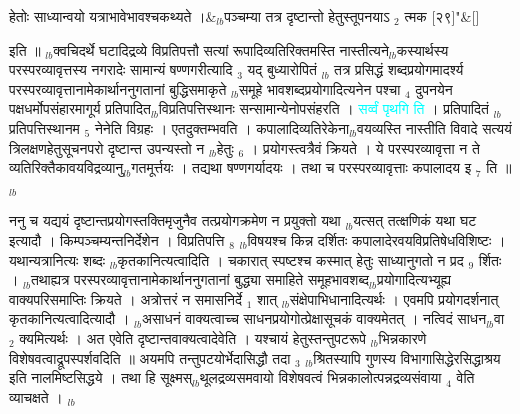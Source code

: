 \documentclass[article,12pt,a4paper]{memoir}%
\newcommand{\quotelemma}[1]{\textcolor{cyan}{#1}}
\newcounter{parCount}
\begin{document}
	    
	    \stanza[\smallbreak]
	  हेतोः साध्यान्वयो यत्राभावेभावश्चकथ्यते ।&{\tiny $_{lb}$}पञ्चम्या तत्र दृष्टान्तो हेतुस्तूपनयाऽ {\tiny $_{2}$} त्मक [२९]{\normalfontlatin\large\qquad{}"}\&[\smallbreak]
	  
	  
	  
	    \pstart  \leavevmode%
	    \hphantom{.}
	   इति ॥ {\tiny $_{lb}$}क्वचिदर्थे घटादिद्रव्ये विप्रतिपत्तौ सत्यां रूपादिव्यतिरिक्तमस्ति नास्तीत्यने{\tiny $_{lb}$}कस्यार्थस्य परस्परव्यावृत्तस्य नगरादेः सामान्यं षण्णगरीत्यादि {\tiny $_{3}$} यद् बुध्यारोपितं {\tiny $_{lb}$} \leavevmode{} तत्र प्रसिद्धं शब्दप्रयोगमादर्श्य परस्परव्यावृत्तानामेकार्थाननुगतानां बुद्धिसमाकृते {\tiny $_{lb}$}समूहे भावशब्दप्रयोगादित्यनेन पश्चा {\tiny $_{4}$} दुपनयेन पक्षधर्मोपसंहारमागूर्य प्रतिपादित{\tiny $_{lb}$}विप्रतिपत्तिस्थानः सन्सामान्येनोपसंहरति । \quotelemma{सर्व्वं पृथगि \cite[10b8]{vn-msN} ति} । प्रतिपादितं {\tiny $_{lb}$}प्रतिपत्तिस्थानम {\tiny $_{5}$} नेनेति विग्रहः । एतदुक्तम्भवति । कपालादिव्यतिरेकेना{\tiny $_{lb}$}वयव्यस्ति नास्तीति विवादे सत्ययं त्रिलक्षणहेतुसूचनपरो दृष्टान्त उपन्यस्तो न {\tiny $_{lb}$}हेतुः {\tiny $_{6}$} । प्रयोगस्त्वत्रैवं क्रियते । ये परस्परव्यावृत्ता न ते व्यतिरिक्तैकावयविद्रव्यानु{\tiny $_{lb}$}गतमूर्त्तयः । तद्यथा षण्णगर्यादयः । तथा च परस्परव्यावृत्ताः कपालादय इ {\tiny $_{7}$} ति ॥
	{}
	\pend%
      {\tiny $_{lb}$}

	  
	  \pstart \leavevmode%
	ननु च यद्ययं दृष्टान्तप्रयोगस्तक्तिमृजुनैव तत्प्रयोगक्रमेण न प्रयुक्तो यथा {\tiny $_{lb}$}यत्सत् तत्क्षणिकं यथा घट इत्यादौ । किम्पञ्चम्यन्तनिर्देशेन । विप्रतिपत्ति {\tiny $_{8}$} {\tiny $_{lb}$}विषयश्च किन्न दर्शितः कपालादेरवयविप्रतिषेधविशिष्टः । यथान्यत्रानित्यः शब्दः {\tiny $_{lb}$}कृतकानित्यत्वादिति । चकारात् स्पष्टश्च कस्मात् हेतुः साध्यानुगतो न प्रद {\tiny $_{9}$} \leavevmode{} र्शितः । {\tiny $_{lb}$}तथाह्यत्र परस्परव्यावृत्तानामेकार्थाननुगतानां बुद्ध्या समाहिते समूहभावशब्द{\tiny $_{lb}$}प्रयोगादित्यभ्यूह्य वाक्यपरिसमाप्तिः क्रियते । अत्रोत्तरं न समासनिर्दे {\tiny $_{1}$} शात् {\tiny $_{lb}$}संक्षेपाभिधानादित्यर्थः । एवमपि प्रयोगदर्शनात् कृतकानित्यत्वादित्यादौ । {\tiny $_{lb}$}असाधनं वाक्यत्वाच्च साधनप्रयोगोत्प्रेक्षासूचकं वाक्यमेतत् । नत्विदं साधन{\tiny $_{lb}$}वा {\tiny $_{2}$} क्यमित्यर्थः । अत एवेति दृष्टान्तवाक्यत्वादेवेति । यश्चायं हेतुस्तन्तुपटरूपे {\tiny $_{lb}$}भिन्नकारणे विशेषवत्वाद्रूपस्पर्शवदिति ॥ अयमपि तन्तुपटयोर्भेदासिद्धौ तदा {\tiny $_{3}$} {\tiny $_{lb}$}श्रितस्यापि गुणस्य विभागासिद्धेरसिद्धाश्रय इति नालमिष्टसिद्धये । तथा हि सूक्ष्मस्{\tiny $_{lb}$}थूलद्रव्यसमवायो विशेषवत्वं भिन्नकालोत्पन्नद्रव्यसंवाया {\tiny $_{4}$} वेति व्याचक्षते ।
	{}
	\pend%
      {\tiny $_{lb}$}
\end{document}
